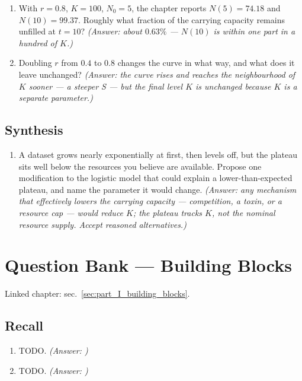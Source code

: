 \documentclass[
]{article}
\providecommand{\tightlist}{%
  \setlength{\itemsep}{0pt}\setlength{\parskip}{0pt}}
\theoremstyle{plain}
\theoremstyle{definition}
\begin{document}
\begin{enumerate}
\def\labelenumi{\arabic{enumi}.}
\setcounter{enumi}{2}
\tightlist
\item
  With \(r = 0.8\), \(K = 100\), \(N_0 = 5\), the chapter reports
  \(N(5) = 74.18\) and \(N(10) = 99.37\). Roughly what fraction of the
  carrying capacity remains unfilled at \(t = 10\)? \emph{(Answer: about
  \(0.63\%\) --- \(N(10)\) is within one part in a hundred of \(K\).)}
\item
  Doubling \(r\) from \(0.4\) to \(0.8\) changes the curve in what way,
  and what does it leave unchanged? \emph{(Answer: the curve rises and
  reaches the neighbourhood of \(K\) sooner --- a steeper S --- but the
  final level \(K\) is unchanged because \(K\) is a separate
  parameter.)}
\end{enumerate}

\subsection{Synthesis}\label{synthesis-3}

\begin{enumerate}
\def\labelenumi{\arabic{enumi}.}
\setcounter{enumi}{4}
\tightlist
\item
  A dataset grows nearly exponentially at first, then levels off, but
  the plateau sits well below the resources you believe are available.
  Propose one modification to the logistic model that could explain a
  lower-than-expected plateau, and name the parameter it would change.
  \emph{(Answer: any mechanism that effectively lowers the carrying
  capacity --- competition, a toxin, or a resource cap --- would reduce
  \(K\); the plateau tracks \(K\), not the nominal resource supply.
  Accept reasoned alternatives.)}
\end{enumerate}

\newpage

\section{Question Bank --- Building
Blocks}\label{sec:q_part_I_building_blocks}

Linked chapter: sec.~\ref{sec:part_I_building_blocks}.

\subsection{Recall}\label{recall-4}

\begin{enumerate}
\def\labelenumi{\arabic{enumi}.}
\item
  TODO. \emph{(Answer: )}
\item
  TODO. \emph{(Answer: )}
\end{enumerate}
\end{document}
